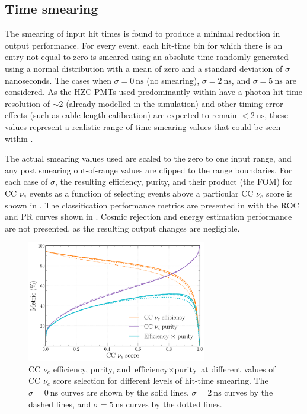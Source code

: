\subsection{Time smearing} %
\label{sec:results_robust_time} %

The smearing of input hit times is found to produce a minimal reduction in output performance. For
every event, each hit-time bin for which there is an entry not equal to zero is smeared using an
absolute time randomly generated using a normal distribution with a mean of zero and a standard
deviation of $\sigma$ nanoseconds. The cases when $\sigma=0~\text{ns}$ (no smearing),
$\sigma=2~\text{ns}$, and $\sigma=5~\text{ns}$ are considered. As the HZC PMTs used predominantly
within \chipsfive have a photon hit time resolution of $\sim$\SI{2}{} (already modelled
in the simulation) and other timing error effects (such as cable length calibration) are expected
to remain $<2~\text{ns}$, these values represent a realistic range of time smearing values that
could be seen within \chipsfive.

The actual smearing values used are scaled to the zero to one input range, and any post smearing
out-of-range values are clipped to the range boundaries. For each case of $\sigma$, the resulting
efficiency, purity, and their product (the FOM) for CC $\nu_{e}$ events as a function of selecting
events above a particular CC $\nu_{e}$ score is shown in
. The classification performance metrics are presented
in  with the ROC and PR curves shown in
. Cosmic rejection and energy estimation performance
are not presented, as the resulting output changes are negligible.

\begin{figure} %
    \includegraphics[width=0.7\textwidth]{diagrams/7-results/calib_time_nuel_eff_curves.pdf}
    \caption[CC $\nu_{e}$ efficiency and purity curves for different levels of hit-time smearing]
    {CC $\nu_{e}$ efficiency, purity, and $\text{efficiency}\times\text{purity}$ at different
        values of CC $\nu_{e}$ score selection for different levels of hit-time smearing. The
        $\sigma=0~\text{ns}$ curves are shown by the solid lines, $\sigma=2~\text{ns}$ curves by
        the dashed lines, and $\sigma=5~\text{ns}$ curves by the dotted lines.}
    \label{fig:calib_time_nuel_eff_curves}
\end{figure}

